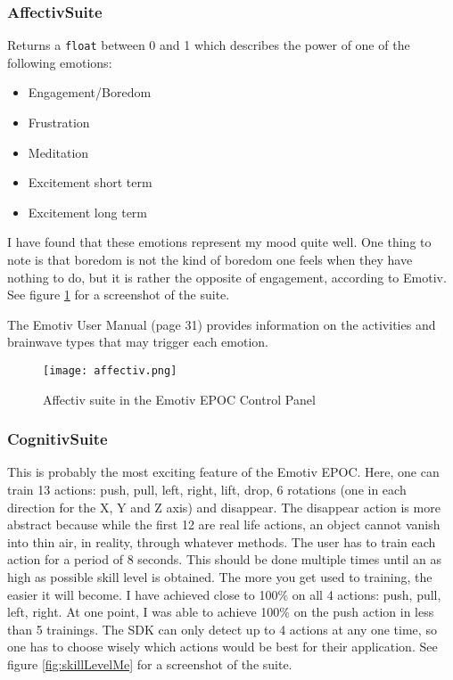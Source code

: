 \subsubsection{Affectiv\texttrademark  Suite}
\label{part:affectiv}
Returns a \texttt{float} between 0 and 1 which describes the power of one of the following emotions:
\begin{itemize}
	\item Engagement/Boredom
	\item Frustration
	\item Meditation
	\item Excitement short term
	\item Excitement long term
\end{itemize}

I have found that these emotions represent my mood quite well. One thing to note is that boredom is not the kind of boredom one feels when they have nothing to do, but it is rather the opposite of engagement, according to Emotiv. See figure \ref{fig:affectiv} for a screenshot of the suite.

The Emotiv User Manual \cite{emotivUserManual} (page 31) provides information on the activities and brainwave types that may trigger each emotion.

\begin{figure}
  \centering
  \texttt{[image: affectiv.png]}
  \caption{Affectiv suite in the Emotiv EPOC Control Panel}
    \label{fig:affectiv}           
\end{figure}

\subsubsection{Cognitiv\texttrademark  Suite}
This is probably the most exciting feature of the Emotiv EPOC. Here, one can train 13 actions: push, pull, left, right, lift, drop, 6 rotations (one in each direction for the X, Y and Z axis) and disappear. The disappear action is more abstract because while the first 12 are real life actions, an object cannot vanish into thin air, in reality, through whatever methods. The user has to train each action for a period of 8 seconds. This should be done multiple times until an as high as possible skill level is obtained. The more you get used to training, the easier it will become. I have achieved close to 100\% on all 4 actions: push, pull, left, right. At one point, I was able to achieve 100\% on the push action in less than 5 trainings. The SDK can only detect up to 4 actions at any one time, so one has to choose wisely which actions would be best for their application. See figure \ref{fig:skillLevelMe} for a screenshot of the suite.

